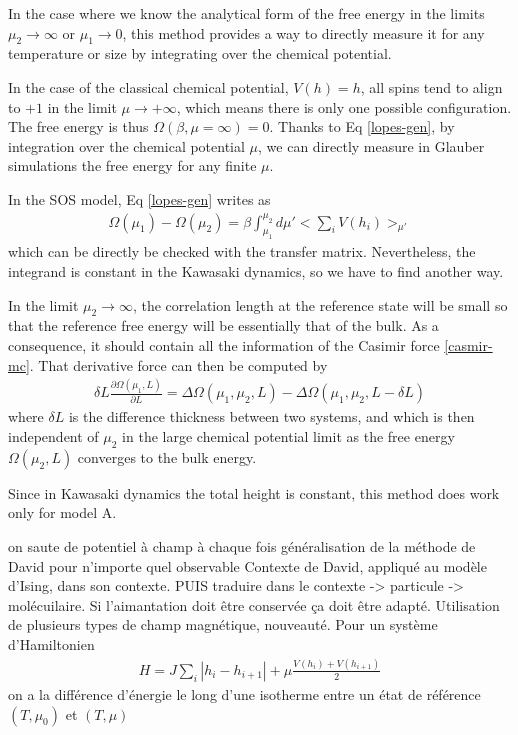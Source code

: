In the case where we know the analytical form of the free energy in the limits $\mu_2 \to \infty$ or $\mu_1 \to 0$, this method provides a way to directly measure it for any temperature or size by integrating over the chemical potential.

In the case of the classical chemical potential, $V(h)=h$, all spins tend to align to $+1$ in the limit $\mu\to +\infty$, which means there is only one possible configuration. The free energy is thus $\Omega(\beta,\mu = \infty) = 0$. Thanks to Eq \eqref{lopes-gen}, by integration over the chemical potential $\mu$, we can directly measure in Glauber simulations the free energy for any finite $\mu$. 

In the SOS model, Eq \eqref{lopes-gen} writes as
\begin{align}
   \Omega(\mu_1) - \Omega(\mu_2) = \beta \int_{\mu_1}^{\mu_2} d\mu'  < \sum_i V(h_i) >_{\mu'} 
\end{align}
which can be directly be checked with the transfer matrix.
Nevertheless, the integrand is constant in the Kawasaki dynamics, so we have to find another way. 

In the limit $\mu_2 \to \infty$, the correlation length at the reference state will be small so that the reference free energy will be essentially that of the bulk. As a consequence, it should contain all the information of the Casimir force \eqref{casmir-mc}. That derivative force can then be computed by 
\begin{align}
\delta L \frac{\partial \Omega(\mu_1,L)}{\partial L} = \Delta \Omega(\mu_1,\mu_2,L)-\Delta \Omega(\mu_1,\mu_2,L-\delta L)
\end{align}
where $\delta L$ is the difference thickness between two systems, and which is then independent of $\mu_2$ in the large chemical potential limit as the free energy $\Omega(\mu_2,L)$ converges to the bulk energy.

Since in Kawasaki dynamics the total height is constant, this method does work only for model A.



{\color{red} on saute de potentiel à champ à chaque fois
généralisation de la méthode de David pour n'importe quel observable
Contexte de David, appliqué au modèle d'Ising, dans son contexte.
PUIS traduire dans le contexte -> particule -> molécuilaire. 
 Si l'aimantation doit être conservée ça doit être adapté. Utilisation de plusieurs types de champ magnétique, nouveauté.}
Pour un système d'Hamiltonien 
\begin{align}
    H = J \sum_i |h_i-h_{i+1}| + \mu \frac{V(h_i)+V(h_{i+1})}{2}
    \label{potentiel-integration-param}
\end{align}
on a la différence d'énergie le long d'une isotherme entre un état de référence $(T,\mu_0)$ et $(T,\mu)$ \cite{lopes_cardozo_critical_2014}

